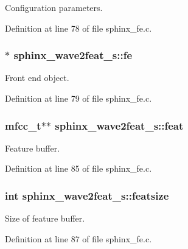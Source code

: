 Configuration parameters. 



Definition at line 78 of file sphinx\+\_\+fe.\+c.

\subsubsection[{fe}]{$\ast$ sphinx\+\_\+wave2feat\+\_\+s\+::fe}\label{structsphinx__wave2feat__s_a5882f148fe200890855304b46f00ee4b}


Front end object. 



Definition at line 79 of file sphinx\+\_\+fe.\+c.

\subsubsection[{feat}]{\setlength{\rightskip}{0pt plus 5cm}mfcc\+\_\+t$\ast$$\ast$ sphinx\+\_\+wave2feat\+\_\+s\+::feat}\label{structsphinx__wave2feat__s_ab43d8d5721133bcaf02da23c0bbb58ae}


Feature buffer. 



Definition at line 85 of file sphinx\+\_\+fe.\+c.

\subsubsection[{featsize}]{\setlength{\rightskip}{0pt plus 5cm}int sphinx\+\_\+wave2feat\+\_\+s\+::featsize}\label{structsphinx__wave2feat__s_ac041852de738a42752be67cceb16660c}


Size of feature buffer. 



Definition at line 87 of file sphinx\+\_\+fe.\+c.

